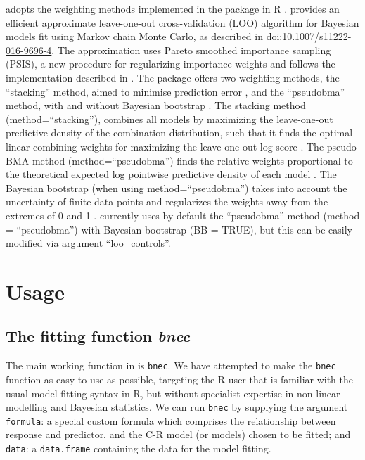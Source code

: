 \documentclass[
  shortnames]{jss}
\begin{document}
 adopts the weighting methods implemented in the  package in R \citep{vehtari2020}.  provides an efficient approximate leave-one-out cross-validation (LOO) algorithm for Bayesian models fit using Markov chain Monte Carlo, as described in \citep{vehtari2017} \url{doi:10.1007/s11222-016-9696-4}. The approximation uses Pareto smoothed importance sampling (PSIS), a new procedure for regularizing importance weights and follows the implementation described in \citep{Vehtari2019}. The  package offers two weighting methods, the ``stacking'' method, aimed to minimise prediction error \citep{Yao2018}, and the ``pseudobma'' method, with and without Bayesian bootstrap \citep{vehtari2020, vehtari2017}. The stacking method (method=``stacking''), combines all models by maximizing the leave-one-out predictive density of the combination distribution, such that it finds the optimal linear combining weights for maximizing the leave-one-out log score \citep{vehtari2020}. The pseudo-BMA method (method=``pseudobma'') finds the relative weights proportional to the theoretical expected log pointwise predictive density of each model \citep{vehtari2020}. The Bayesian bootstrap (when using method=``pseudobma'') takes into account the uncertainty of finite data points and regularizes the weights away from the extremes of 0 and 1 \citep{vehtari2020}.  currently uses by default the ``pseudobma'' method (method = ``pseudobma'') with Bayesian bootstrap (BB = TRUE), but this can be easily modified via argument ``loo\_controls''.

\hypertarget{usage}{%
\section{Usage}\label{usage}}

\subsection[The fitting function bnec]{The fitting function \emph{bnec}}\label{ffbnec}

The main working function in  is \texttt{bnec}. We have attempted to make the \texttt{bnec} function as easy to use as possible, targeting the R user that is familiar with the usual model fitting syntax in R, but without specialist expertise in non-linear modelling and Bayesian statistics. We can run \texttt{bnec} by supplying the argument \texttt{formula}: a special custom formula which comprises the relationship between response and predictor, and the C-R model (or models) chosen to be fitted; and \texttt{data}: a \texttt{data.frame} containing the data for the model fitting.
\end{document}
